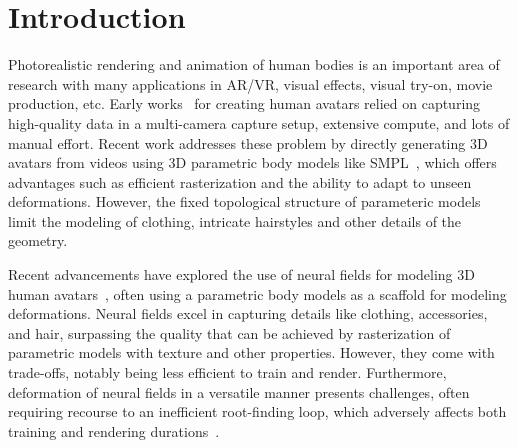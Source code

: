 \section{Introduction}

Photorealistic rendering and animation of human bodies is an important area of research with many applications in AR/VR, visual effects, visual try-on, movie production, etc. 
{Early works~\cite{alexander2010emily, alexander2013digitalira, anguelov2005scape} for creating human avatars relied on capturing high-quality data in a multi-camera capture setup, extensive compute, and lots of manual effort.} 
Recent work addresses these problem by directly generating 3D avatars from videos %
using 3D parametric body models like SMPL~\cite{SMPL:2015, pavlakos2019smplx}, which offers advantages such as efficient rasterization and the ability to adapt to unseen deformations. However, the fixed topological structure of parameteric models limit the modeling of clothing, intricate hairstyles and other details of the geometry.

Recent advancements have explored the use of neural fields for modeling 3D human avatars~\cite{guo2023vid2avatar, jiang2022neuman, weng2022humannerf, peng2021neuralbody, bergman2022gnarf, dong2023ag3d}, often using a parametric body models as a scaffold for modeling deformations. Neural fields excel in capturing details like clothing, accessories, and hair, surpassing the quality that can be achieved by rasterization of parametric models with texture and other properties. However, they come with trade-offs, notably being less efficient to train and render.
Furthermore, deformation of neural fields in a versatile manner presents challenges, often requiring recourse to an inefficient root-finding loop, which adversely affects both training and rendering durations~\cite{chen2021snarf,jiang2022instantavatar,yu2023monohuman}.


